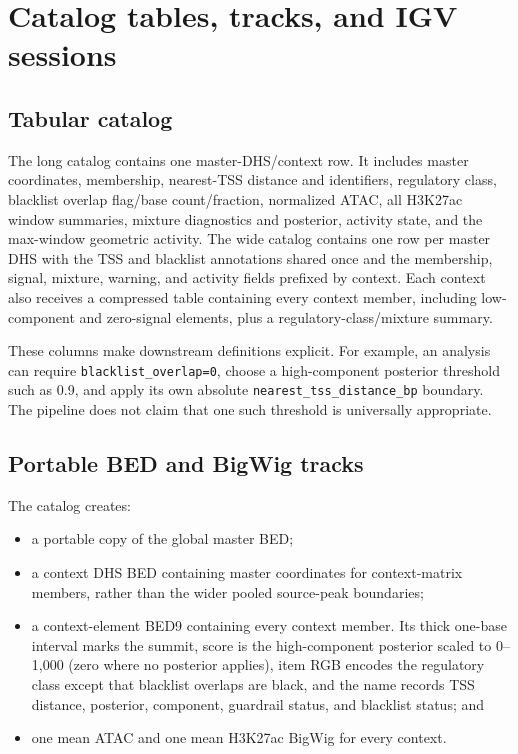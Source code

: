 \documentclass[11pt]{article}
\begin{document}
\section{Catalog tables, tracks, and IGV sessions}

\subsection{Tabular catalog}

The long catalog contains one master-DHS/context row.  It includes master
coordinates, membership, nearest-TSS distance and identifiers, regulatory
class, blacklist overlap flag/base count/fraction, normalized ATAC, all
H3K27ac window summaries, mixture diagnostics and posterior, activity state,
and the max-window geometric activity.  The wide catalog contains one row per
master DHS with the TSS and blacklist annotations shared once and the
membership, signal, mixture, warning, and activity fields prefixed by context.
Each context also receives a compressed table containing every context member,
including low-component and zero-signal elements, plus a
regulatory-class/mixture summary.

These columns make downstream definitions explicit.  For example, an analysis
can require \texttt{blacklist\_overlap=0}, choose a high-component posterior
threshold such as 0.9, and apply its own absolute
\texttt{nearest\_tss\_distance\_bp} boundary.  The pipeline does not claim that
one such threshold is universally appropriate.

\subsection{Portable BED and BigWig tracks}

The catalog creates:

\begin{itemize}
  \item a portable copy of the global master BED;
  \item a context DHS BED containing master coordinates for context-matrix
  members, rather than the wider pooled source-peak boundaries;
  \item a context-element BED9 containing every context member.  Its thick
  one-base interval marks the summit, score is the high-component posterior
  scaled to 0--1,000 (zero where no posterior applies), item RGB encodes the
  regulatory class except that blacklist overlaps are black, and the name
  records TSS distance, posterior, component, guardrail status, and blacklist
  status; and
  \item one mean ATAC and one mean H3K27ac BigWig for every context.
\end{itemize}
\end{document}

